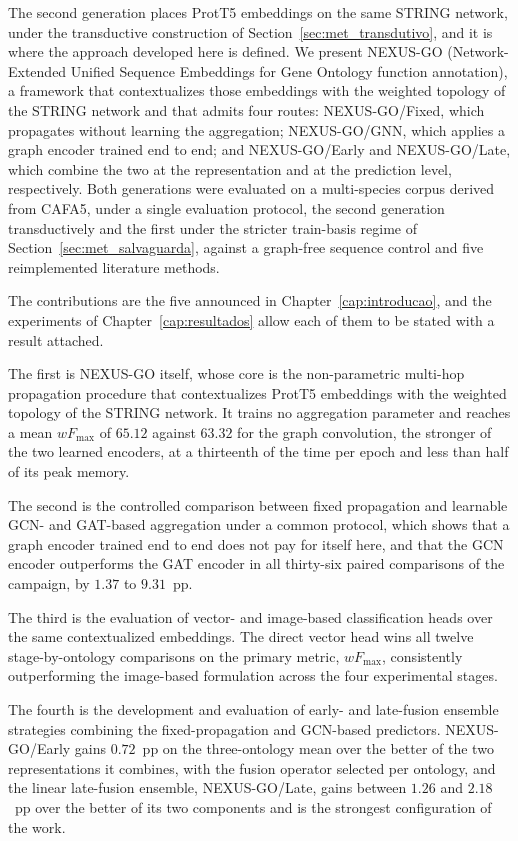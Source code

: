 \documentclass[Ingles]{ic-tese-v3}
\begin{document}
The second generation places ProtT5 embeddings on the same STRING network, under the
transductive construction of Section~\ref{sec:met_transdutivo}, and it is where the
approach developed here is defined. We present NEXUS-GO (Network-Extended Unified Sequence
Embeddings for Gene Ontology function annotation), a framework that contextualizes those
embeddings with the weighted topology of the STRING network and that admits four routes: NEXUS-GO/Fixed, which propagates without learning the aggregation; NEXUS-GO/GNN, which applies
a graph encoder trained end to end; and NEXUS-GO/Early and NEXUS-GO/Late, which combine the two
at the representation and at the prediction level, respectively. Both generations were evaluated on
a multi-species corpus derived from CAFA5, under a single evaluation protocol, the second
generation transductively and the first under the stricter train-basis regime of
Section~\ref{sec:met_salvaguarda}, against a graph-free sequence control and five reimplemented
literature methods.


The contributions are the five announced in Chapter~\ref{cap:introducao}, and the
experiments of Chapter~\ref{cap:resultados} allow each of them to be stated with a result
attached.

The first is NEXUS-GO itself, whose core is the non-parametric multi-hop propagation
procedure that contextualizes ProtT5 embeddings with the weighted topology of the STRING
network. It trains no aggregation parameter and reaches a mean $wF_{\max}$ of $65.12$ against
$63.32$ for the graph convolution, the stronger of the two learned encoders, at a thirteenth
of the time per epoch and less than half of its peak memory.

The second is the controlled comparison between fixed propagation and learnable GCN- and
GAT-based aggregation under a common protocol, which shows that a graph encoder trained end
to end does not pay for itself here, and that the GCN encoder outperforms the GAT encoder in
all thirty-six paired comparisons of the campaign, by $1.37$ to $9.31$~pp.

The third is the evaluation of vector- and image-based classification heads over the same
contextualized embeddings. The direct vector head wins all twelve stage-by-ontology
comparisons on the primary metric, $wF_{\max}$, consistently outperforming the image-based
formulation across the four experimental stages.

The fourth is the development and evaluation of early- and late-fusion ensemble strategies
combining the fixed-propagation and GCN-based predictors. NEXUS-GO/Early gains $0.72$~pp on
the three-ontology mean over the better of the two representations it combines, with the
fusion operator selected per ontology, and the linear late-fusion ensemble, NEXUS-GO/Late,
gains between $1.26$ and $2.18$~pp over the better of its two components and is the strongest
configuration of the work.
\end{document}
